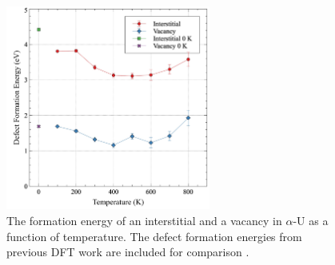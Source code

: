 \documentclass[utf8]{frontiersSCNS} %
\begin{document}
 \begin{figure}[hbt]
	\centering
	\includegraphics[width=0.6\textwidth]{defect_eform.jpg}
  \caption{The formation energy of an interstitial and a vacancy in $\alpha$-U as a function of temperature. The defect formation energies from previous DFT work are included for comparison \cite{wirth2011}.}\label{fig:defs}
\end{figure}
\end{document}
